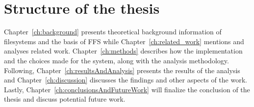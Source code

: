 \section{Structure of the thesis} %
Chapter~\ref{ch:background} presents theoretical background information of filesystems and the basis of FFS while Chapter~\ref{ch:related_work} mentions and analyses related work. Chapter~\ref{ch:methods} describes how the implementation and the choices made for the system, along with the analysis methodology. Following, Chapter~\ref{ch:resultsAndAnalysis} presents the results of the analysis and Chapter~\ref{ch:discussion} discusses the findings and other aspects of the work. Lastly, Chapter~\ref{ch:conclusionsAndFutureWork} will finalize the conclusion of the thesis and discuss potential future work.